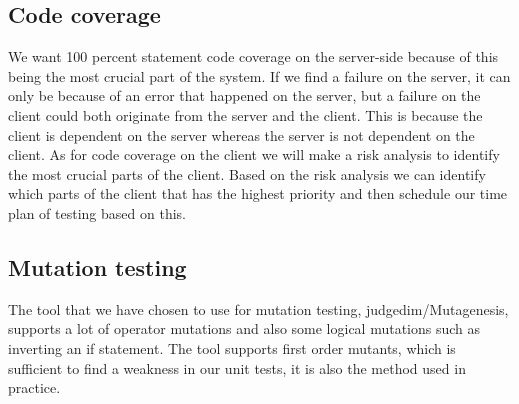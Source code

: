 \documentclass[a4paper,12pt]{memoir}
\begin{document}
\subsection{Code coverage}
We want 100 percent statement code coverage on the server-side because of this being the most crucial part of the system. If we find a failure on the server, it can only be because of an error that happened on the server, but a failure on the client could both originate from the server and the client. This is because the client is dependent on the server whereas the server is not dependent on the client. As for code coverage on the client we will make a risk analysis to identify the most crucial parts of the client. Based on the risk analysis we can identify which parts of the client that has the highest priority and then schedule our time plan of testing based on this.

\subsection{Mutation testing} %
The tool that we have chosen to use for mutation testing, judgedim/Mutagenesis, supports a lot of operator mutations and also some logical mutations such as inverting an if statement. The tool supports first order mutants, which is sufficient to find a weakness in our unit tests, it is also the method used in practice. 
\end{document}
